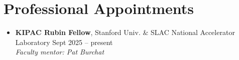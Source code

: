 \section{Professional Appointments}

\begin{itemize}
    \item \textbf{KIPAC Rubin Fellow}, Stanford Univ. \& SLAC National Accelerator Laboratory
    \hfill Sept 2025 -- present \\
    \textit{Faculty mentor: Pat Burchat}
\end{itemize}